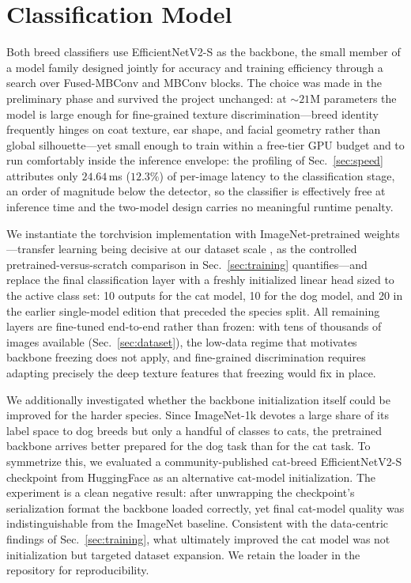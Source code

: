 \section{Classification Model}
\label{sec:model}

Both breed classifiers use EfficientNetV2-S \cite{tan2021efficientnetv2} as
the backbone, the small member of a model family designed jointly for
accuracy and training efficiency through a search over Fused-MBConv and
MBConv blocks. The choice was made in the preliminary phase and survived the
project unchanged: at ${\sim}21$M parameters the model is large enough for
fine-grained texture discrimination---breed identity frequently hinges on
coat texture, ear shape, and facial geometry rather than global
silhouette---yet small enough to train within a free-tier GPU budget and to
run comfortably inside the inference envelope: the profiling of
Sec.~\ref{sec:speed} attributes only $24.64$\,ms ($12.3\%$) of per-image
latency to the classification stage, an order of magnitude below the
detector, so the classifier is effectively free at inference time and the
two-model design carries no meaningful runtime penalty.

We instantiate the torchvision implementation with ImageNet-pretrained
weights---transfer learning being decisive at our dataset scale
\cite{kornblith2019transfer}, as the controlled pretrained-versus-scratch
comparison in Sec.~\ref{sec:training} quantifies---and replace the final
classification layer with a freshly initialized linear head sized to the
active class set: 10 outputs for the cat model, 10 for the dog model, and 20
in the earlier single-model edition that preceded the species split. All remaining layers are fine-tuned end-to-end rather than frozen: with tens
of thousands of images available (Sec.~\ref{sec:dataset}), the low-data
regime that motivates backbone freezing does not apply, and fine-grained
discrimination requires adapting precisely the deep texture features that
freezing would fix in place.

We additionally investigated whether the backbone initialization itself could
be improved for the harder species. Since ImageNet-1k devotes a large share
of its label space to dog breeds but only a handful of classes to cats, the
pretrained backbone arrives better prepared for the dog task than for the cat
task. To symmetrize this, we evaluated a community-published cat-breed
EfficientNetV2-S checkpoint from HuggingFace as an alternative cat-model
initialization. The experiment is a clean negative result: after unwrapping
the checkpoint's serialization format the backbone loaded correctly, yet final cat-model quality was indistinguishable from the
ImageNet baseline. Consistent with the data-centric findings of
Sec.~\ref{sec:training}, what ultimately improved the cat model was not
initialization but targeted dataset expansion. We retain the loader in the
repository for reproducibility.
